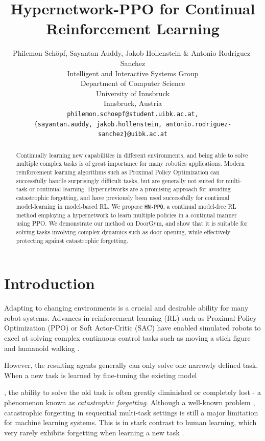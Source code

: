 \documentclass[dvipsnames]{article} %
\title{Hypernetwork-PPO for Continual Reinforcement Learning}
\author{Philemon Schöpf, Sayantan Auddy, Jakob Hollenstein \& Antonio Rodriguez-Sanchez\\
Intelligent and Interactive Systems Group \\
Department of Computer Science\\
University of Innsbruck\\
Innsbruck, Austria \\
\texttt{philemon.schoepf@student.uibk.ac.at,} \\
\texttt{\{sayantan.auddy, jakob.hollenstein, antonio.rodriguez-sanchez\}@uibk.ac.at} \\
}
\newcommand{\commentOLD}[1]{}
\newcommand{\saOLD}[1] {\commentOLD{{\color{cyan} SA: #1}}}                %
\newcommand{\jhOLD}[1] {\commentOLD{{\color{RawSienna} JH: #1}}}           %
\newcommand{\asOLD}[1] {\commentOLD{{\color{orange} AS: #1}}}              %
\begin{document}
\maketitle
\saOLD{We need to think about the title. At present this is far too generic.}

\begin{abstract}
\jhOLD{Recently someone mentioned the following structure for the abstract: 1/3 introduction, 1/3 problem, 1/3 solution.}
Continually learning new capabilities in different environments, and being able to solve multiple complex tasks is of great importance for many robotics applications. Modern reinforcement learning algorithms such as Proximal Policy Optimization can successfully handle surprisingly difficult tasks, but are generally not suited for multi-task or continual learning. Hypernetworks are a promising approach for avoiding catastrophic forgetting, and have previously been used successfully for continual model-learning in model-based RL. We propose \texttt{HN-PPO}, a continual model-free RL method employing a hypernetwork to learn multiple policies in a continual manner using PPO. We demonstrate our method on DoorGym, and show that it is suitable for solving tasks involving complex dynamics such as door opening, while effectively protecting against catastrophic forgetting. 
\end{abstract}


\section{Introduction}
\label{chap:intro}
Adapting to changing environments is a crucial and desirable ability for many robot systems. Advances in reinforcement learning (RL) such as Proximal Policy Optimization (PPO) \citep{ppo} or Soft Actor-Critic (SAC) \citep{sac} have enabled simulated robots to excel at solving complex continuous control tasks such as moving a stick figure and humanoid walking \citep{ppo}. 
\saOLD{PPO and SAC are both algorithms for continuous action spaces, while Atari games have a discrete action space. Change this to a suitable example.}
However, the resulting agents generally can only solve one narrowly defined task. When a new task is learned by fine-tuning the existing model 
\asOLD{is "fine-tuning" the right word?, maybe"adjustment"?}\jhOLD{I think fine-tuning is the right word, but fine-tuning is not very common in RL; I mean the continual-RL field is very young/small; So I think you should add a little bit of text that smooths the transition and explains that you want to extend or re-use the previously learned things. Maybe the problem is that here you basically introduce continual learning without mentioning continual learning.}
, the ability to solve the old task is often greatly diminished or completely lost - a phenomenon known as \textit{catastrophic forgetting}\saOLD{Cite the Parisi CL review paper}. Although a well-known problem \citep{MCCLOSKEY1989109}, catastrophic forgetting in sequential multi-task settings is still a major limitation for machine learning systems. This is in stark contrast to human learning, which very rarely exhibits forgetting when learning a new task \citep{parisiClReview}.
\end{document}
